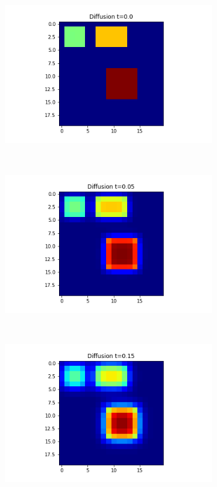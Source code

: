 \documentclass[10pt,a4paper]{article}
\theoremstyle{plain}
\theoremstyle{definition}
\begin{document}
    	\begin{figure}[!h]
    		\centering
    		\begin{subfigure}[b]{0.25\textwidth}
    			\includegraphics[width=\textwidth]{images/nolongrange-t0.png}
    			\caption{}
    			\label{nolongranget0}
    		\end{subfigure}~
    		\begin{subfigure}[b]{0.25\textwidth}
    			\includegraphics[width= \textwidth]{images/nolongrange-t05.png}
    			\caption{}
    			\label{nolongranget05}
    		\end{subfigure}~
    		\begin{subfigure}[b]{0.25\textwidth}
    			\includegraphics[width= \textwidth]{images/nolongrange-t3.png}

\end{subfigure}
\end{figure}
\end{document}
